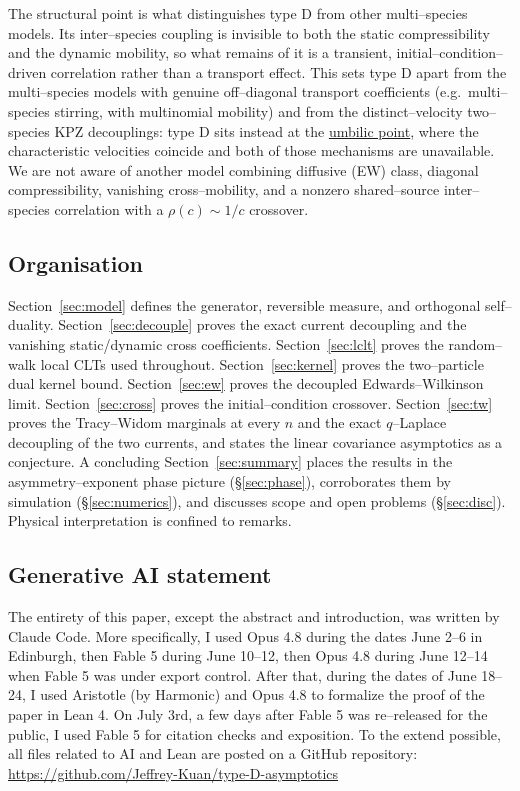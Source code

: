 \documentclass[11pt]{article}
\theoremstyle{plain}
\theoremstyle{definition}
\theoremstyle{remark}
\begin{document}
The structural point is what distinguishes type D from other multi--species models. Its
inter--species coupling is invisible to both the static compressibility and the dynamic
mobility, so what remains of it is a transient, initial--condition--driven correlation
rather than a transport effect. This sets type D apart from the multi--species models
with genuine off--diagonal transport coefficients (e.g.\ multi--species stirring, with
multinomial mobility) and from the distinct--velocity two--species KPZ decouplings:
type D sits instead at the \underline{umbilic point}, where the characteristic velocities
coincide and both of those mechanisms are unavailable. We are not aware of another
model combining diffusive (EW) class, diagonal compressibility, vanishing
cross--mobility, and a nonzero shared--source inter--species correlation with a
$\rho(c)\sim1/c$ crossover.

\subsection{Organisation}\label{sec:introorg}
Section~\ref{sec:model} defines the generator, reversible measure, and orthogonal
self--duality. Section~\ref{sec:decouple} proves the exact current decoupling and the
vanishing static/dynamic cross coefficients. Section~\ref{sec:lclt} proves the
random--walk local CLTs used throughout. Section~\ref{sec:kernel} proves the
two--particle dual kernel bound. Section~\ref{sec:ew} proves the decoupled
Edwards--Wilkinson limit. Section~\ref{sec:cross} proves the initial--condition
crossover. Section~\ref{sec:tw} proves the Tracy--Widom marginals at every $n$ and
the exact $q$--Laplace decoupling of the two currents, and states the linear
covariance asymptotics as a conjecture. A concluding Section~\ref{sec:summary} places the
results in the asymmetry--exponent phase picture (\S\ref{sec:phase}), corroborates them
by simulation (\S\ref{sec:numerics}), and discusses scope and open problems
(\S\ref{sec:disc}). Physical interpretation is confined to remarks.

\subsection{Generative AI statement}
The entirety of this paper, except the abstract and introduction, was written by Claude Code. More specifically, I used Opus 4.8 during the dates June 2--6 in Edinburgh, then Fable 5 during June 10--12, then Opus 4.8 during June 12--14 when Fable 5 was under export control. After that, during the dates of June 18--24, I used Aristotle (by Harmonic) and Opus 4.8 to formalize the proof of the paper in Lean 4. On July 3rd, a few days after Fable 5 was re--released for the public, I used Fable 5 for citation checks and exposition. To the extend possible, all files related to AI and Lean are posted on a GitHub repository: \url{https://github.com/Jeffrey-Kuan/type-D-asymptotics}
\end{document}
